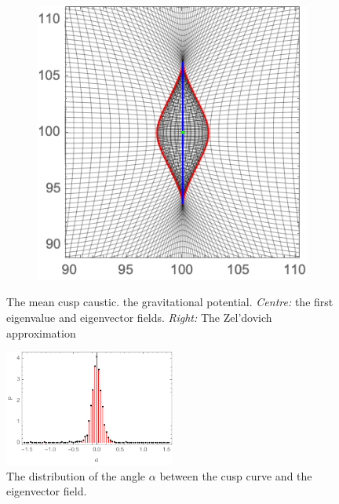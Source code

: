 \documentclass[a4paper, 11pt]{article}
\begin{document}
\begin{figure}
\begin{subfigure}[b]{0.32\textwidth}
\end{subfigure}~
\begin{subfigure}[b]{0.32\textwidth}
\includegraphics[width=\textwidth]{Cusp_mean_Z}
\end{subfigure}
\caption{The mean cusp caustic.  the gravitational potential. \textit{Centre:} the first eigenvalue and eigenvector fields. \textit{Right:} The Zel'dovich approximation}\label{fig:meanCusp}
\end{figure}

\begin{figure}
\centering
\includegraphics[width=0.5\textwidth]{alpha}
\caption{The distribution of the angle $\alpha$ between the cusp curve and the eigenvector field.} 
\label{fig:alpha}
\end{figure}

\end{document}
